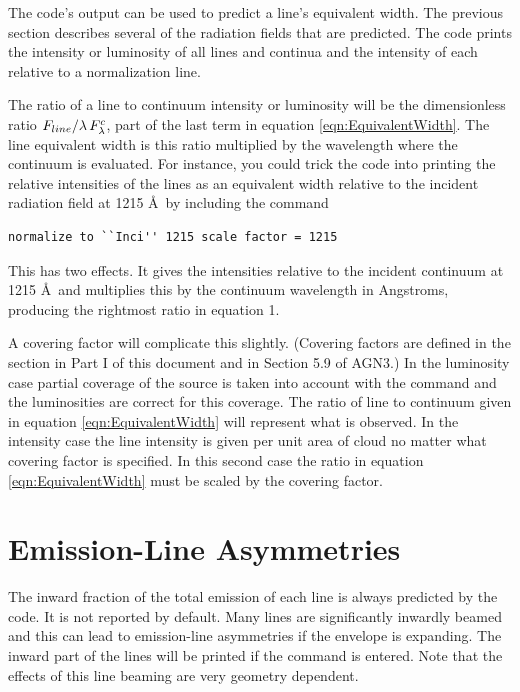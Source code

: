 The code's output can be used to predict a line's equivalent width.
The previous section describes several of the radiation fields
that are predicted.
The code prints the intensity or luminosity of all lines and continua and
the intensity of each relative to a normalization line.

The ratio of a line to continuum intensity or luminosity will be the
dimensionless ratio ${{{F_{line}}} \mathord{\left/
{\vphantom {{{F_{line}}} {\lambda \,F_\lambda ^c}}} \right.
 \kern-\nulldelimiterspace} {\lambda \,F_\lambda ^c}}$,
part of the last term in equation \ref{eqn:EquivalentWidth}.
The line equivalent width is
this ratio multiplied by the wavelength where the continuum is evaluated.
For instance, you could trick the code into printing
the relative intensities
of the lines as an equivalent width relative to the
incident radiation field at 1215 \AA\ by including the command
\begin{verbatim}
normalize to ``Inci'' 1215 scale factor = 1215
\end{verbatim}
This has two effects.
It gives the intensities relative to the
incident continuum at 1215 \AA\ and multiplies this by the continuum
wavelength in Angstroms, producing the rightmost ratio in equation 1.

A covering factor will complicate this slightly.
(Covering factors are
defined in the section  in Part I
of this document and in Section 5.9 of AGN3.)
In the luminosity case partial coverage of the source is
taken into account with the  command
and the luminosities are correct for this coverage.
The ratio of line to continuum given in
equation \ref{eqn:EquivalentWidth} will represent what is observed.
In the intensity case the line
intensity is given per unit area of cloud no matter what covering factor
is specified.
In this second case the ratio in equation \ref{eqn:EquivalentWidth}
must be scaled by the covering factor.

\section{Emission-Line Asymmetries}

The inward fraction of the total emission of each line is always predicted
by the code.
It is not reported by default.
Many lines are significantly
inwardly beamed and this can lead to emission-line asymmetries if the
envelope is expanding.
The inward part of the lines will be printed if
the  command is entered.
Note that the effects of this line beaming
are very geometry dependent.

